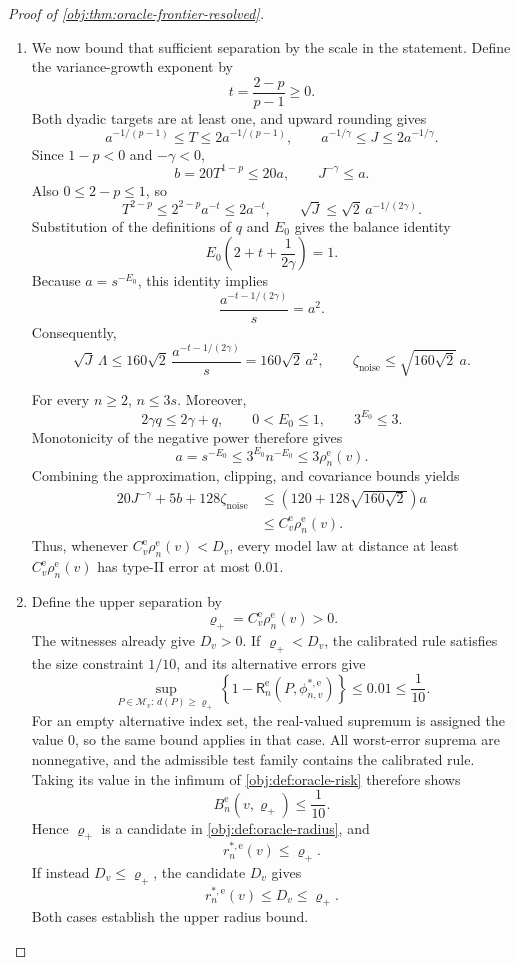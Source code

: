 \documentclass[11pt]{article}
\begin{document}
\begin{proof}[Proof of \cref{obj:thm:oracle-frontier-resolved}]
\begin{enumerate}
\item We now bound that sufficient separation by the scale in the statement. Define the variance-growth exponent by
\[
t=\frac{2-p}{p-1}\ge0.
\]
Both dyadic targets are at least one, and upward rounding gives
\[
a^{-1/(p-1)}\le T\le2a^{-1/(p-1)},
\qquad
a^{-1/\gamma}\le J\le2a^{-1/\gamma}.
\]
Since \(1-p<0\) and \(-\gamma<0\),
\[
b=20T^{1-p}\le20a,
\qquad
J^{-\gamma}\le a.
\]
Also \(0\le2-p\le1\), so
\[
T^{2-p}
\le2^{2-p}a^{-t}\le2a^{-t},
\qquad
\sqrt J\le\sqrt2\,a^{-1/(2\gamma)}.
\]
Substitution of the definitions of \(q\) and \(E_0\) gives the balance identity
\[
E_0\left(2+t+\frac1{2\gamma}\right)=1.
\]
Because \(a=s^{-E_0}\), this identity implies
\[
\frac{a^{-t-1/(2\gamma)}}s=a^2.
\]
Consequently,
\[
\sqrt J\,\Lambda
\le160\sqrt2\,\frac{a^{-t-1/(2\gamma)}}s
=160\sqrt2\,a^2,
\qquad
\zeta_{\mathrm{noise}}\le\sqrt{160\sqrt2}\,a.
\]

For every \(n\ge2\), \(n\le3s\). Moreover,
\[
2\gamma q\le2\gamma+q,\qquad 0<E_0\le1,
\qquad 3^{E_0}\le3.
\]
Monotonicity of the negative power therefore gives
\[
a=s^{-E_0}
\le3^{E_0}n^{-E_0}
\le3\rho_n^{\mathrm e}(v).
\]
Combining the approximation, clipping, and covariance bounds yields
\[
\begin{aligned}
20J^{-\gamma}+5b+128\zeta_{\mathrm{noise}}
&\le\left(120+128\sqrt{160\sqrt2}\right)a\\
&\le C^{\mathrm e}_v\rho_n^{\mathrm e}(v).
\end{aligned}
\]
Thus, whenever \(C^{\mathrm e}_v\rho_n^{\mathrm e}(v)<D_v\), every model law at distance at least \(C^{\mathrm e}_v\rho_n^{\mathrm e}(v)\) has type-II error at most \(0.01\).

\item Define the upper separation by
\[
\varrho_+=C^{\mathrm e}_v\rho_n^{\mathrm e}(v)>0.
\]
The witnesses already give \(D_v>0\). If \(\varrho_+<D_v\), the calibrated rule satisfies the size constraint \(1/10\), and its alternative errors give
\[
\sup_{P\in\mathcal M_v:\,d(P)\ge\varrho_+}
\left\{1-\mathsf R_n^{\mathrm e}(P,\phi^{*,\mathrm e}_{n,v})\right\}
\le0.01\le\frac1{10}.
\]
For an empty alternative index set, the real-valued supremum is assigned the value \(0\), so the same bound applies in that case. All worst-error suprema are nonnegative, and the admissible test family contains the calibrated rule. Taking its value in the infimum of \cref{obj:def:oracle-risk} therefore shows
\[
B_n^{\mathrm e}(v,\varrho_+)\le\frac1{10}.
\]
Hence \(\varrho_+\) is a candidate in \cref{obj:def:oracle-radius}, and
\[
r_n^{*,\mathrm e}(v)\le\varrho_+.
\]
If instead \(D_v\le\varrho_+\), the candidate \(D_v\) gives
\[
r_n^{*,\mathrm e}(v)\le D_v\le\varrho_+.
\]
Both cases establish the upper radius bound.


\end{enumerate}
\end{proof}
\end{document}
